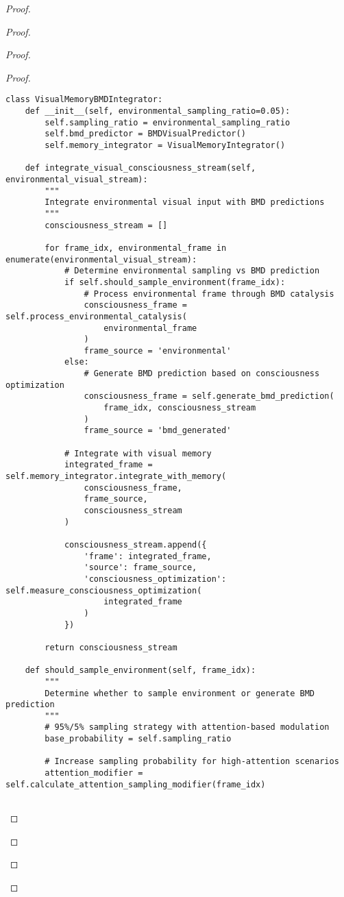 \documentclass[12pt,a4paper]{article}
\begin{document}
\begin{proof}
{\begin{proof}
\begin{proof}
\begin{proof}
\begin{lstlisting}[style=pythonstyle, caption=Visual Memory BMD Integration]
class VisualMemoryBMDIntegrator:
    def __init__(self, environmental_sampling_ratio=0.05):
        self.sampling_ratio = environmental_sampling_ratio
        self.bmd_predictor = BMDVisualPredictor()
        self.memory_integrator = VisualMemoryIntegrator()
        
    def integrate_visual_consciousness_stream(self, environmental_visual_stream):
        """
        Integrate environmental visual input with BMD predictions
        """
        consciousness_stream = []
        
        for frame_idx, environmental_frame in enumerate(environmental_visual_stream):
            # Determine environmental sampling vs BMD prediction
            if self.should_sample_environment(frame_idx):
                # Process environmental frame through BMD catalysis
                consciousness_frame = self.process_environmental_catalysis(
                    environmental_frame
                )
                frame_source = 'environmental'
            else:
                # Generate BMD prediction based on consciousness optimization
                consciousness_frame = self.generate_bmd_prediction(
                    frame_idx, consciousness_stream
                )
                frame_source = 'bmd_generated'
            
            # Integrate with visual memory
            integrated_frame = self.memory_integrator.integrate_with_memory(
                consciousness_frame,
                frame_source,
                consciousness_stream
            )
            
            consciousness_stream.append({
                'frame': integrated_frame,
                'source': frame_source,
                'consciousness_optimization': self.measure_consciousness_optimization(
                    integrated_frame
                )
            })
        
        return consciousness_stream
    
    def should_sample_environment(self, frame_idx):
        """
        Determine whether to sample environment or generate BMD prediction
        """
        # 95%/5% sampling strategy with attention-based modulation
        base_probability = self.sampling_ratio
        
        # Increase sampling probability for high-attention scenarios
        attention_modifier = self.calculate_attention_sampling_modifier(frame_idx)
        

\end{lstlisting}
\end{proof}
\end{proof}
\end{proof}}
\end{proof}
\end{document}
